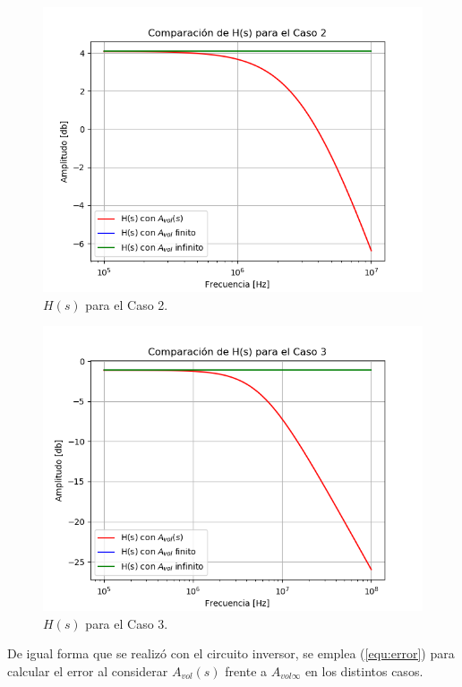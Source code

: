 \begin{figure}[H]	
	\centering
	\includegraphics[width=\textwidth]{Ejercicio1/Imagenes/HCompC2_noinv.png}
	\caption{$H(s)$ para el Caso 2.}
	\label{fig:AvolC2_noinv}
\end{figure}

\begin{figure}[H]	
	\centering
	\includegraphics[width=\textwidth]{Ejercicio1/Imagenes/HCompC3_noinv.png}
	\caption{$H(s)$ para el Caso 3.}
	\label{fig:AvolC3_noinv}
\end{figure}

De igual forma que se realizó con el circuito inversor, se emplea (\ref{equ:error}) para calcular el error al considerar $A_{vol} (s)$ frente a $A_{vol \infty}$ en los distintos casos.

